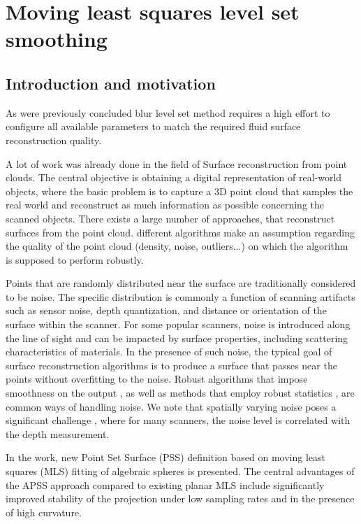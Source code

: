 \chapter{Moving least squares level set smoothing} \label{sec:mls}
\section{Introduction and motivation}
As were previously concluded blur level set method requires a high effort to configure all available parameters to match the required fluid surface reconstruction quality.

A lot of work was already done in the field of Surface reconstruction from point clouds. 
The central objective is obtaining a digital representation of real-world objects, where the basic problem is to capture a 3D point cloud that samples the real world and reconstruct as much information as possible concerning the scanned objects. There exists a large number of approaches, that reconstruct surfaces from the point cloud. different algorithms make an assumption regarding the quality of the point cloud (density, noise, outliers...) on which the algorithm is supposed to perform robustly.

Points that are randomly distributed near the surface are traditionally considered to be noise. The specific distribution is commonly a function of scanning artifacts such as sensor noise, depth quantization, and distance or orientation of the surface within the scanner. For some popular scanners, noise is introduced along the line of sight and can be impacted by surface properties, including scattering characteristics of materials. In the presence of such noise, the typical goal of surface reconstruction algorithms is to produce a surface that passes near the points without overfitting to the noise. Robust algorithms that impose smoothness on the output \cite{PSR}, as well as methods that employ robust statistics \cite{FPPSKR}, are common ways of handling noise. We note that spatially varying noise poses a significant challenge \cite{NSRFRPS}, where for many scanners, the noise level is correlated with the depth measurement.

In the work, \cite{Apss} new Point Set Surface (PSS) definition based on moving least squares (MLS) fitting of algebraic spheres is presented. The central advantages of the APSS approach compared to existing planar MLS include significantly improved stability of the projection under low sampling rates and in the presence of high curvature.

